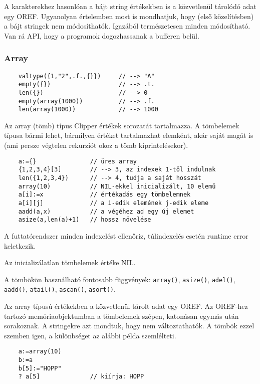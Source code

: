 A karakterekhez hasonlóan a bájt string értékekben is a közvetlenül tárolódó 
adat egy OREF. Ugyanolyan értelemben most is mondhatjuk, hogy (első közelítésben)
a bájt stringek nem módosíthatók.  Igazából természetesen minden módosítható.
Van rá API, hogy a programok dogozhassanak a bufferen belül.


\subsubsection{Array}

\begin{verbatim}
    valtype({1,"2",.f.,{}})     // --> "A"
    empty({})                   // --> .t.
    len({})                     // --> 0
    empty(array(1000))          // --> .f.
    len(array(1000))            // --> 1000
\end{verbatim}

Az array (tömb) típus Clipper értékek sorozatát tartalmazza.
A tömbelemek típusa bármi lehet, bármilyen értéket tartalmazhat
elemként, akár saját magát is (ami persze végtelen rekurziót okoz
a tömb kiprintelésekor).

\begin{verbatim}
    a:={}               // üres array
    {1,2,3,4}[3]        // --> 3, az indexek 1-től indulnak
    len({1,2,3,4})      // --> 4, tudja a saját hosszát
    array(10)           // NIL-ekkel inicializált, 10 elemű
    a[i]:=x             // értékadás egy tömbelemnek
    a[i][j]             // a i-edik elemének j-edik eleme
    aadd(a,x)           // a végéhez ad egy új elemet
    asize(a,len(a)+1)   // hossz növelése
\end{verbatim}

A futtatórendszer minden indexelést ellenőriz, 
túlindexelés esetén runtime error keletkezik. 

Az inicializálatlan tömbelemek értéke NIL.

A tömbökön használható fontosabb függvények:
\verb!array()!,
\verb!asize()!,
\verb!adel()!,
\verb!aadd()!,
\verb!atail()!,
\verb!ascan()!,
\verb!asort()!.

Az array típusú értékekben a közvetlenül tárolt adat egy OREF.
Az OREF-hez tartozó memóriaobjektumban a tömbelemek szépen, 
katonásan egymás után sorakoznak.
A stringekre azt mondtuk, hogy nem változtathatók.
A tömbök ezzel szemben igen, a különbséget az alábbi példa
szemlélteti.

\begin{verbatim}
    a:=array(10)
    b:=a
    b[5]:="HOPP"
    ? a[5]              // kiírja: HOPP
\end{verbatim}


